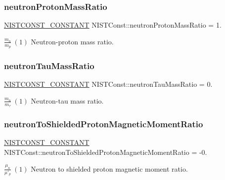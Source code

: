 \subsubsection{\texorpdfstring{neutron\+Proton\+Mass\+Ratio}{neutronProtonMassRatio}}
{\footnotesize\ttfamily \mbox{\hyperlink{_n_i_s_t_const_8hpp_a2b0fc1d7452373f816175dd86ce26729}{N\+I\+S\+T\+C\+O\+N\+S\+T\+\_\+\+C\+O\+N\+S\+T\+A\+NT}} N\+I\+S\+T\+Const\+::neutron\+Proton\+Mass\+Ratio = 1.}

$\frac{m_n}{m_p} \ (1)$ Neutron-\/proton mass ratio. \mbox{\label{group___n_i_s_t_const-_neutron_ga0694ef4af94520ba68040847c26b8f7f}} 
\subsubsection{\texorpdfstring{neutron\+Tau\+Mass\+Ratio}{neutronTauMassRatio}}
{\footnotesize\ttfamily \mbox{\hyperlink{_n_i_s_t_const_8hpp_a2b0fc1d7452373f816175dd86ce26729}{N\+I\+S\+T\+C\+O\+N\+S\+T\+\_\+\+C\+O\+N\+S\+T\+A\+NT}} N\+I\+S\+T\+Const\+::neutron\+Tau\+Mass\+Ratio = 0.}

$\frac{m_n}{m_\tau} \ (1)$ Neutron-\/tau mass ratio. \mbox{\label{group___n_i_s_t_const-_neutron_gade519a41d92b6d1844a8ff1a24d5438f}} 
\subsubsection{\texorpdfstring{neutron\+To\+Shielded\+Proton\+Magnetic\+Moment\+Ratio}{neutronToShieldedProtonMagneticMomentRatio}}
{\footnotesize\ttfamily \mbox{\hyperlink{_n_i_s_t_const_8hpp_a2b0fc1d7452373f816175dd86ce26729}{N\+I\+S\+T\+C\+O\+N\+S\+T\+\_\+\+C\+O\+N\+S\+T\+A\+NT}} N\+I\+S\+T\+Const\+::neutron\+To\+Shielded\+Proton\+Magnetic\+Moment\+Ratio = -\/0.}

$\frac{\mu_n}{\mu'_p} \ (1)$ Neutron to shielded proton magnetic moment ratio. 